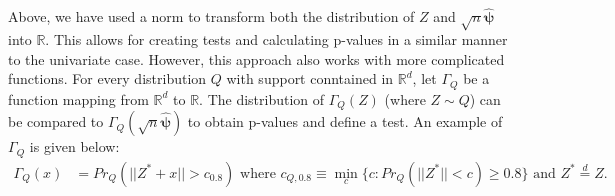 \documentclass{article}
\newcommand{\disto}{P}
\newcommand{\rvv}{Z}
\newcommand{\distv}{Q}
\begin{document}
Above, we have used a norm to transform both the distribution of $\rvv$ and $\sqrt{n}\hat{\boldsymbol{\psi}}$ into $\mathbb{R}$.  This allows for creating tests and calculating p-values in a similar manner to the univariate case. 
However, this approach also works with more complicated functions.  For every distribution $\distv$ with support conntained in $\mathbb{R}^d$, let $\Gamma_{\distv}$ be a function mapping from  $\mathbb{R}^d$ to $\mathbb{R}$.
The distribution of $\Gamma_\distv(\rvv)$ (where $\rvv \sim \distv$)
can be compared to $\Gamma_\distv(\sqrt{n}\hat{\boldsymbol{\psi}})$ to obtain p-values and define a test. An example of $\Gamma_\distv$ is given below:
\begin{align}
	\Gamma_\distv(x) &= Pr_\distv(||\rvv^* + x|| > c_{0.8})  \text{ where }  c_{\distv, 0.8} \equiv \min_{c}\{c : Pr_\distv(||\rvv^*|| < c) \geq 0.8 \} \text{ and } \rvv^* \overset{d}{=} \rvv. \label{gamma:pow}
\end{align}
\end{document}

